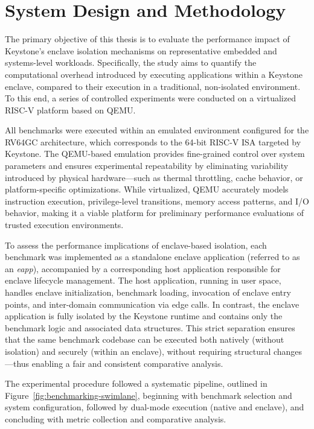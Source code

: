 \chapter{System Design and Methodology}
\label{chap:methodology}

The primary objective of this thesis is to evaluate the performance impact of Keystone’s enclave isolation mechanisms on representative embedded and systems-level workloads. Specifically, the study aims to quantify the computational overhead introduced by executing applications within a Keystone enclave, compared to their execution in a traditional, non-isolated environment. To this end, a series of controlled experiments were conducted on a virtualized RISC-V platform based on QEMU.

All benchmarks were executed within an emulated environment configured for the RV64GC architecture, which corresponds to the 64-bit RISC-V ISA targeted by Keystone. The QEMU-based emulation provides fine-grained control over system parameters and ensures experimental repeatability by eliminating variability introduced by physical hardware—such as thermal throttling, cache behavior, or platform-specific optimizations. While virtualized, QEMU accurately models instruction execution, privilege-level transitions, memory access patterns, and I/O behavior, making it a viable platform for preliminary performance evaluations of trusted execution environments.

To assess the performance implications of enclave-based isolation, each benchmark was implemented as a standalone enclave application (referred to as an \textit{eapp}), accompanied by a corresponding host application responsible for enclave lifecycle management. The host application, running in user space, handles enclave initialization, benchmark loading, invocation of enclave entry points, and inter-domain communication via edge calls. In contrast, the enclave application is fully isolated by the Keystone runtime and contains only the benchmark logic and associated data structures. This strict separation ensures that the same benchmark codebase can be executed both natively (without isolation) and securely (within an enclave), without requiring structural changes—thus enabling a fair and consistent comparative analysis.

The experimental procedure followed a systematic pipeline, outlined in Figure~\ref{fig:benchmarking-swimlane}, beginning with benchmark selection and system configuration, followed by dual-mode execution (native and enclave), and concluding with metric collection and comparative analysis.

